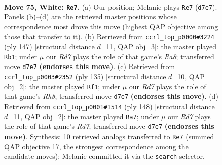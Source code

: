\documentclass[11pt]{article}
\begin{document}
\clearpage

\begin{figure}[p]\centering
\begin{subfigure}{0.46\textwidth}\centering
\resizebox{\linewidth}{!}{%
\newchessgame
\chessboard[
  setfen={5rk1/P2R4/8/8/8/8/6K1/8 w - - 19 75},
  showmover=false,
  pgfstyle=straightmove, color=movearrow, markmove={d7-e7}
]}
\caption{}
\end{subfigure}\hfill
\begin{subfigure}{0.46\textwidth}\centering
\resizebox{\linewidth}{!}{%
\newchessgame
\chessboard[
  setfen={8/8/6k1/6p1/8/8/5RKP/r7 b - - 11 74},
  showmover=false,
  pgfstyle=straightmove, color=movearrow, markmove={a1-b1}
]}
\caption{}
\end{subfigure}
\\[4pt]
\begin{subfigure}{0.46\textwidth}\centering
\resizebox{\linewidth}{!}{%
\newchessgame
\chessboard[
  setfen={8/1K6/1R6/p7/k1P5/8/8/7r b - - 2 68},
  showmover=false,
  pgfstyle=straightmove, color=movearrow, markmove={h1-f1}
]}
\caption{}
\end{subfigure}\hfill
\begin{subfigure}{0.46\textwidth}\centering
\resizebox{\linewidth}{!}{%
\newchessgame
\chessboard[
  setfen={8/3R4/8/6pP/4kr2/8/8/3K4 w - - 16 75},
  showmover=false,
  pgfstyle=straightmove, color=movearrow, markmove={d7-a7}
]}
\caption{}
\end{subfigure}
\caption{\textbf{Move 75, White: \texttt{Re7}.} (a) Our position; Melanie plays \texttt{Re7} (\texttt{d7e7}). Panels (b)--(d) are the retrieved master positions whose correspondence most drove this move (highest QAP objective among those that transfer to it). (b) Retrieved from \texttt{ccrl\_top\_p0000\#3224} (ply 147) [structural distance $d$=11, QAP obj=3]: the master played \texttt{Rb1}; under $\mu$ our \emph{Rd7} plays the role of that game's \emph{Ra8}; transferred move \texttt{d7e7} \textbf{(endorses this move)}. (c) Retrieved from \texttt{ccrl\_top\_p0003\#2352} (ply 135) [structural distance $d$=10, QAP obj=2]: the master played \texttt{Rf1}; under $\mu$ our \emph{Rd7} plays the role of that game's \emph{Rh8}; transferred move \texttt{d7e7} \textbf{(endorses this move)}. (d) Retrieved from \texttt{ccrl\_top\_p0001\#1514} (ply 148) [structural distance $d$=11, QAP obj=2]: the master played \texttt{Ra7}; under $\mu$ our \emph{Rd7} plays the role of that game's \emph{Rd7}; transferred move \texttt{d7e7} \textbf{(endorses this move)}. Synthesis: 10 retrieved analogs transferred to \texttt{Re7} (summed QAP objective 17, the strongest correspondence among the candidate moves); Melanie committed it via the \texttt{search} selector.}
\label{fig:thought-m148}
\end{figure}
\end{document}
